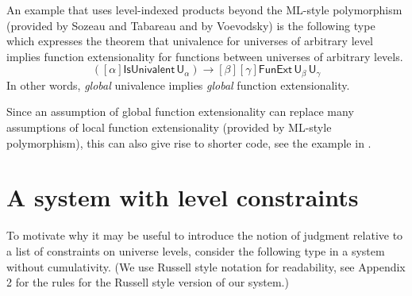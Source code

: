 \documentclass[11pt,a4paper]{article}
\theoremstyle{definition}
\newcommand{\NN}{\mathsf{N}}
\newcommand{\UU}{\mathsf{U}}
\begin{document}
An example that uses level-indexed products beyond the ML-style
polymorphism (provided by Sozeau and Tabareau and by Voevodsky)
is the following type which
expresses the theorem that univalence for universes of arbitrary level implies
function extensionality for functions between universes of arbitrary levels.
$$
([\alpha]\mathsf{IsUnivalent}\, \UU_\alpha)
\to [\beta][\gamma] \mathsf{FunExt}\, \UU_\beta\, \UU_\gamma
$$
In other words, {\em global} univalence  implies {\em global} function extensionality. 

Since an assumption of global function extensionality can replace many assumptions of local function extensionality (provided by ML-style polymorphism), this can also give rise to shorter code, see the example in \cite{escardo:UFinAgda}.





\section{A system with level constraints}\label{sec:constraints}

To motivate why it may be useful to introduce the notion of judgment relative to a list of constraints on universe levels, consider the following type in a system without cumulativity. (We use Russell style notation for readability, see Appendix 2 for the rules for the Russell style version of our system.)
\end{document}
